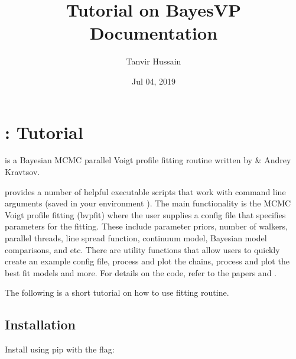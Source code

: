 \documentclass[a4paper,11pt,english]{sphinxmanual}
\title{Tutorial on BayesVP Documentation}
\date{Jul 04, 2019}
\author{Tanvir Hussain}
\begin{document}
\pagestyle{empty}
\maketitle
\pagestyle{plain}
\sphinxtableofcontents
\pagestyle{normal}
\label{\detokenize{tutorial::doc}}



\chapter{: Tutorial}
\label{\detokenize{tutorial:bayesvp-tutorial}}
 is a Bayesian MCMC parallel Voigt profile fitting routine
written by  \& Andrey Kravtsov.

 provides a number of helpful executable scripts that work
with command line arguments (saved in your environment ). The
main functionality is the MCMC Voigt profile fitting (bvpfit) where the
user supplies a config file that specifies parameters for the fitting.
These include parameter priors, number of walkers, parallel threads,
line spread function, continuum model, Bayesian model comparisons, and
etc. There are utility functions that allow users to quickly create an
example config file, process and plot the chains, process and plot the
best fit models and more. For details on the code, refer to the papers
 and .

The following is a short tutorial on how to use  fitting
routine.


\section{Installation}
\label{\detokenize{tutorial:installation}}
Install  using pip with the  flag:

%
\begin{sphinxVerbatim}[commandchars=\\\{\}]
   
\end{sphinxVerbatim}
\end{document}
